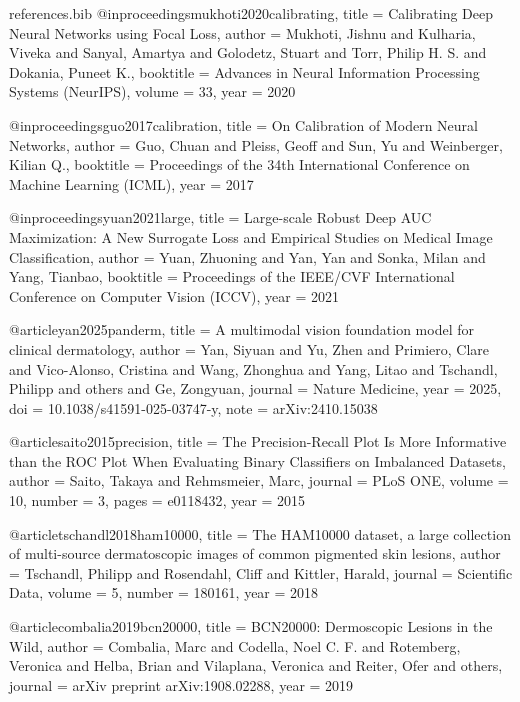 \begin{filecontents*}[overwrite]{references.bib}
@inproceedings{mukhoti2020calibrating,
  title     = {Calibrating Deep Neural Networks using Focal Loss},
  author    = {Mukhoti, Jishnu and Kulharia, Viveka and Sanyal, Amartya and Golodetz, Stuart and Torr, Philip H. S. and Dokania, Puneet K.},
  booktitle = {Advances in Neural Information Processing Systems (NeurIPS)},
  volume    = {33},
  year      = {2020}
}

@inproceedings{guo2017calibration,
  title     = {On Calibration of Modern Neural Networks},
  author    = {Guo, Chuan and Pleiss, Geoff and Sun, Yu and Weinberger, Kilian Q.},
  booktitle = {Proceedings of the 34th International Conference on Machine Learning (ICML)},
  year      = {2017}
}

@inproceedings{yuan2021large,
  title     = {Large-scale Robust Deep {AUC} Maximization: A New Surrogate Loss and Empirical Studies on Medical Image Classification},
  author    = {Yuan, Zhuoning and Yan, Yan and Sonka, Milan and Yang, Tianbao},
  booktitle = {Proceedings of the IEEE/CVF International Conference on Computer Vision (ICCV)},
  year      = {2021}
}

@article{yan2025panderm,
  title   = {A multimodal vision foundation model for clinical dermatology},
  author  = {Yan, Siyuan and Yu, Zhen and Primiero, Clare and Vico-Alonso, Cristina and Wang, Zhonghua and Yang, Litao and Tschandl, Philipp and others and Ge, Zongyuan},
  journal = {Nature Medicine},
  year    = {2025},
  doi     = {10.1038/s41591-025-03747-y},
  note    = {arXiv:2410.15038}
}

@article{saito2015precision,
  title   = {The Precision-Recall Plot Is More Informative than the {ROC} Plot When Evaluating Binary Classifiers on Imbalanced Datasets},
  author  = {Saito, Takaya and Rehmsmeier, Marc},
  journal = {PLoS ONE},
  volume  = {10},
  number  = {3},
  pages   = {e0118432},
  year    = {2015}
}

@article{tschandl2018ham10000,
  title   = {The {HAM10000} dataset, a large collection of multi-source dermatoscopic images of common pigmented skin lesions},
  author  = {Tschandl, Philipp and Rosendahl, Cliff and Kittler, Harald},
  journal = {Scientific Data},
  volume  = {5},
  number  = {180161},
  year    = {2018}
}

@article{combalia2019bcn20000,
  title   = {{BCN20000}: Dermoscopic Lesions in the Wild},
  author  = {Combalia, Marc and Codella, Noel C. F. and Rotemberg, Veronica and Helba, Brian and Vilaplana, Veronica and Reiter, Ofer and others},
  journal = {arXiv preprint arXiv:1908.02288},
  year    = {2019}
}


\end{filecontents*}
